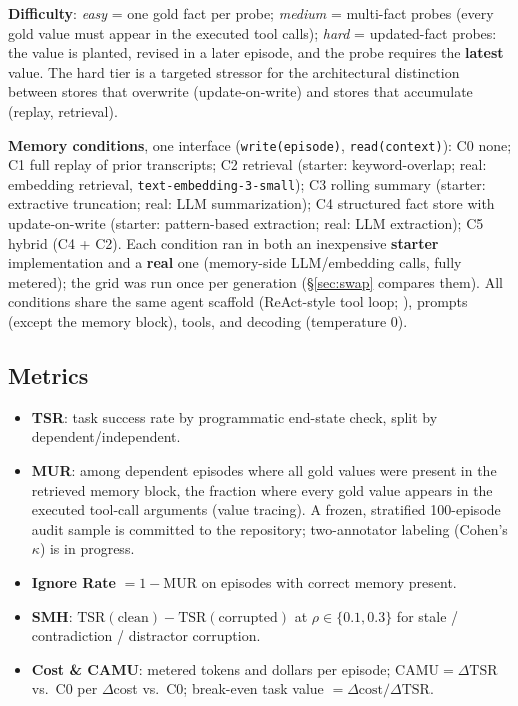 \documentclass[journal]{IEEEtran}
\begin{document}
\textbf{Difficulty}: \emph{easy} = one gold fact per probe; \emph{medium} =
multi-fact probes (every gold value must appear in the executed tool calls);
\emph{hard} = updated-fact probes: the value is planted, revised in a later
episode, and the probe requires the \textbf{latest} value. The hard tier is a
targeted stressor for the architectural distinction between stores that
overwrite (update-on-write) and stores that accumulate (replay, retrieval).

\textbf{Memory conditions}, one interface (\texttt{write(episode)},
\texttt{read(context)}): C0 none; C1 full replay of prior transcripts; C2
retrieval (starter: keyword-overlap; real: embedding retrieval,
\texttt{text-embedding-3-small}); C3 rolling summary (starter: extractive
truncation; real: LLM summarization); C4 structured fact store with
update-on-write (starter: pattern-based extraction; real: LLM extraction);
C5 hybrid (C4 + C2). Each condition ran in both an inexpensive
\textbf{starter} implementation and a \textbf{real} one (memory-side
LLM/embedding calls, fully metered); the grid was run once per generation
(\S\ref{sec:swap} compares them). All conditions share the same agent
scaffold (ReAct-style tool loop; \cite{react}), prompts (except the
memory block), tools, and decoding (temperature 0).

\subsection{Metrics}\label{sec:metrics}

\begin{itemize}
\item \textbf{TSR}: task success rate by programmatic end-state check, split
by dependent/independent.
\item \textbf{MUR}: among dependent episodes where all gold values were
present in the retrieved memory block, the fraction where every gold value
appears in the executed tool-call arguments (value tracing). A frozen,
stratified 100-episode audit sample is committed to the repository;
two-annotator labeling (Cohen's $\kappa$) is in progress.
\item \textbf{Ignore Rate} $= 1 - \mathrm{MUR}$ on episodes with correct
memory present.
\item \textbf{SMH}: $\mathrm{TSR}(\text{clean}) -
\mathrm{TSR}(\text{corrupted})$ at $\rho \in \{0.1, 0.3\}$ for stale /
contradiction / distractor corruption.
\item \textbf{Cost \& CAMU}: metered tokens and dollars per episode;
$\mathrm{CAMU} = \Delta\mathrm{TSR}$ vs.\ C0 per $\Delta$cost vs.\ C0;
break-even task value $= \Delta\text{cost}/\Delta\mathrm{TSR}$.
\end{itemize}
\end{document}
